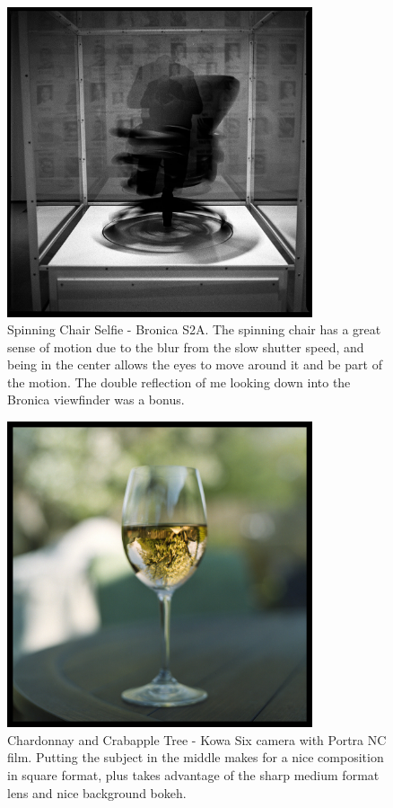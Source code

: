 \documentclass[a4paper]{article}
\begin{document}
\begin{figure}[ht!]
    \centering
    \includegraphics[width=90mm]{img/38908023902_4baf06c19e_k.jpeg}
    \caption{Spinning Chair Selfie - Bronica S2A. The spinning chair has a great sense of motion due to the blur from the slow shutter speed, and being in the center allows the eyes to move around it and be part of the motion. The double reflection of me looking down into the Bronica viewfinder was a bonus.}
\end{figure}

\begin{figure}[ht!]
    \centering
    \includegraphics[width=90mm]{img/49839226537_a983ab355f_k.jpeg}
    \caption{Chardonnay and Crabapple Tree - Kowa Six camera with Portra NC film. Putting the subject in the middle makes for a nice composition in square format, plus takes advantage of the sharp medium format lens and nice background bokeh.}
\end{figure}
\end{document}
